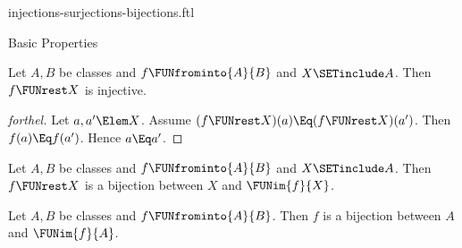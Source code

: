 \documentclass{stex}
\begin{document}
\begin{smodule}{injections-surjections-bijections.ftl}
\begin{sfragment}{Basic Properties}
  \begin{proposition}[forthel]
    Let $A, B$ be classes and $f \FUNfrominto{A}{B}$ and $X \SETinclude A$.
    Then $f \FUNrest X$ is injective.
  \end{proposition}
  \begin{proof}[forthel]
    Let $a, a' \Elem X$.
    Assume $(f \FUNrest X)(a) \Eq (f \FUNrest X)(a')$.
    Then $f(a) \Eq f(a')$.
    Hence $a \Eq a'$.
  \end{proof}

  
  \begin{proposition}[forthel,name=bijectivity of restriction of injection]
    Let $A, B$ be classes and $f \FUNfrominto{A}{B}$ and $X \SETinclude A$.
    Then $f \FUNrest X$ is a bijection between $X$ and $\FUNim{f}{X}$.
  \end{proposition}

  \begin{corollary}[forthel]
    Let $A, B$ be classes and $f \FUNfrominto{A}{B}$.
    Then $f$ is a bijection between $A$ and $\FUNim{f}{A}$.
  \end{corollary}
\end{sfragment}
\end{smodule}
\end{document}
